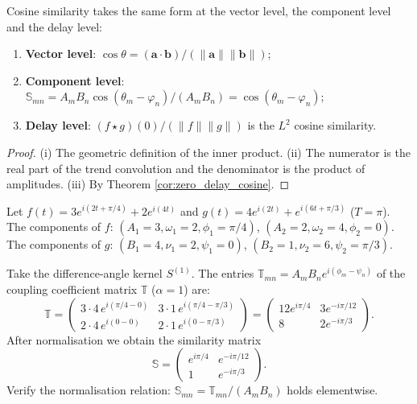 \begin{theorem}\label{thm:three_layer_identity}
Cosine similarity takes the same form at the vector level, the component level and the delay level:
\begin{enumerate}[label=(\roman*)]
    \item \textbf{Vector level}: $\cos\theta = (\mathbf{a} \cdot \mathbf{b})/(\|\mathbf{a}\| \|\mathbf{b}\|)$;
    \item \textbf{Component level}: $\mathbb{S}_{mn} = A_m B_n \cos(\theta_m - \varphi_n)/(A_m B_n) = \cos(\theta_m - \varphi_n)$;
    \item \textbf{Delay level}: $(f \star g)(0)/(\|f\| \|g\|)$ is the $L^2$ cosine similarity.
\end{enumerate}
\end{theorem}

\begin{proof}
(i) The geometric definition of the inner product. (ii) The numerator is the real part of the trend convolution and the denominator is the product of amplitudes. (iii) By Theorem \ref{cor:zero_delay_cosine}.
\end{proof}

\begin{example}\label{ex:component_tendency_similarity}
Let $f(t) = 3 e^{i(2t + \pi/4)} + 2 e^{i(4t)}$ and $g(t) = 4 e^{i(2t)} + e^{i(6t + \pi/3)}$ ($T = \pi$). The components of $f$: $(A_1=3, \omega_1=2, \phi_1=\pi/4)$, $(A_2=2, \omega_2=4, \phi_2=0)$. The components of $g$: $(B_1=4, \nu_1=2, \psi_1=0)$, $(B_2=1, \nu_2=6, \psi_2=\pi/3)$.

Take the difference-angle kernel $S^{(1)}$. The entries $\mathbb{T}_{mn} = A_m B_n e^{i(\phi_m - \psi_n)}$ of the coupling coefficient matrix $\mathbb{T}$ ($\alpha = 1$) are:
\[
\mathbb{T} = \begin{pmatrix}
3 \cdot 4\, e^{i(\pi/4 - 0)} & 3 \cdot 1\, e^{i(\pi/4 - \pi/3)} \\
2 \cdot 4\, e^{i(0 - 0)} & 2 \cdot 1\, e^{i(0 - \pi/3)}
\end{pmatrix}
= \begin{pmatrix}
12 e^{i\pi/4} & 3 e^{-i\pi/12} \\
8 & 2 e^{-i\pi/3}
\end{pmatrix}.
\]
After normalisation we obtain the similarity matrix
\[
\mathbb{S} = \begin{pmatrix}
e^{i\pi/4} & e^{-i\pi/12} \\
1 & e^{-i\pi/3}
\end{pmatrix}.
\]
Verify the normalisation relation: $\mathbb{S}_{mn} = \mathbb{T}_{mn}/(A_m B_n)$ holds elementwise.
\end{example}

